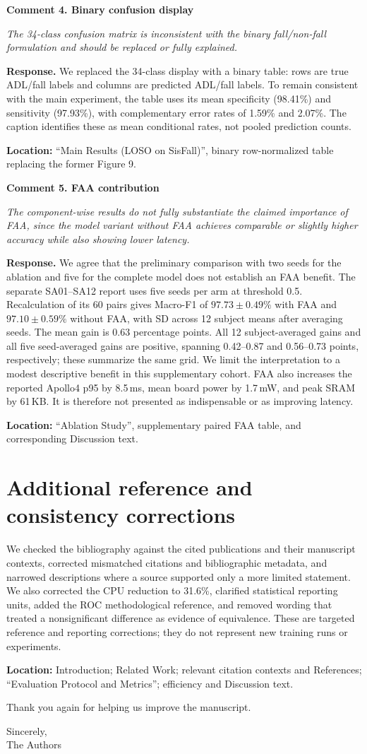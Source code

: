 \documentclass[11pt]{article}
\newcommand{\ReviewerComment}[1]{\textit{#1}\par}
\newcommand{\AuthorResponse}[1]{\textbf{Response.} #1\par}
\newcommand{\ManuscriptChange}[1]{{\small\textbf{Location:} #1}\par}
\newcommand{\commentheading}[1]{\par\medskip\textbf{#1}\par\nopagebreak[4]}
\begin{document}
\clearpage
\commentheading{Comment 4. Binary confusion display}
\ReviewerComment{The 34-class confusion matrix is inconsistent with the binary fall/non-fall formulation and should be replaced or fully explained.}
\AuthorResponse{We replaced the 34-class display with a binary table: rows are true ADL/fall labels and columns are predicted ADL/fall labels. To remain consistent with the main experiment, the table uses its mean specificity (98.41\%) and sensitivity (97.93\%), with complementary error rates of 1.59\% and 2.07\%. The caption identifies these as mean conditional rates, not pooled prediction counts.}
\ManuscriptChange{``Main Results (LOSO on SisFall)'', binary row-normalized table replacing the former Figure 9.}

\commentheading{Comment 5. FAA contribution}
\ReviewerComment{The component-wise results do not fully substantiate the claimed importance of FAA, since the model variant without FAA achieves comparable or slightly higher accuracy while also showing lower latency.}
\AuthorResponse{We agree that the preliminary comparison with two seeds for the ablation and five for the complete model does not establish an FAA benefit. The separate SA01--SA12 report uses five seeds per arm at threshold 0.5. Recalculation of its 60 pairs gives Macro-F1 of $97.73\pm0.49\%$ with FAA and $97.10\pm0.59\%$ without FAA, with SD across 12 subject means after averaging seeds. The mean gain is 0.63 percentage points. All 12 subject-averaged gains and all five seed-averaged gains are positive, spanning 0.42--0.87 and 0.56--0.73 points, respectively; these summarize the same grid. We limit the interpretation to a modest descriptive benefit in this supplementary cohort. FAA also increases the reported Apollo4 p95 by 8.5\,ms, mean board power by 1.7\,mW, and peak SRAM by 61\,KB. It is therefore not presented as indispensable or as improving latency.}
\ManuscriptChange{``Ablation Study'', supplementary paired FAA table, and corresponding Discussion text.}

\section*{Additional reference and consistency corrections}

We checked the bibliography against the cited publications and their manuscript contexts, corrected mismatched citations and bibliographic metadata, and narrowed descriptions where a source supported only a more limited statement. We also corrected the CPU reduction to 31.6\%, clarified statistical reporting units, added the ROC methodological reference, and removed wording that treated a nonsignificant difference as evidence of equivalence. These are targeted reference and reporting corrections; they do not represent new training runs or experiments.

\ManuscriptChange{Introduction; Related Work; relevant citation contexts and References; ``Evaluation Protocol and Metrics''; efficiency and Discussion text.}

Thank you again for helping us improve the manuscript.

Sincerely,\\
The Authors
\end{document}
